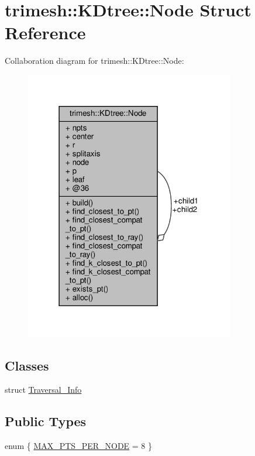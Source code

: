 \hypertarget{structtrimesh_1_1KDtree_1_1Node}{}\section{trimesh\+:\+:K\+Dtree\+:\+:Node Struct Reference}
\label{structtrimesh_1_1KDtree_1_1Node}


Collaboration diagram for trimesh\+:\+:K\+Dtree\+:\+:Node\+:\nopagebreak
\begin{figure}[H]
\begin{center}
\leavevmode
\includegraphics[width=259pt]{d1/dff/structtrimesh_1_1KDtree_1_1Node__coll__graph}
\end{center}
\end{figure}
\subsection*{Classes}
\begin{DoxyCompactItemize}
\item 
struct \hyperlink{structtrimesh_1_1KDtree_1_1Node_1_1Traversal__Info}{Traversal\+\_\+\+Info}
\end{DoxyCompactItemize}
\subsection*{Public Types}
\begin{DoxyCompactItemize}
\item 
enum \{ \hyperlink{structtrimesh_1_1KDtree_1_1Node_a1416dc745c17c28b906e41698ef25fd6a3b052d5faa949e7df63472f40af97624}{M\+A\+X\+\_\+\+P\+T\+S\+\_\+\+P\+E\+R\+\_\+\+N\+O\+DE} = 8
 \}
\end{DoxyCompactItemize}
